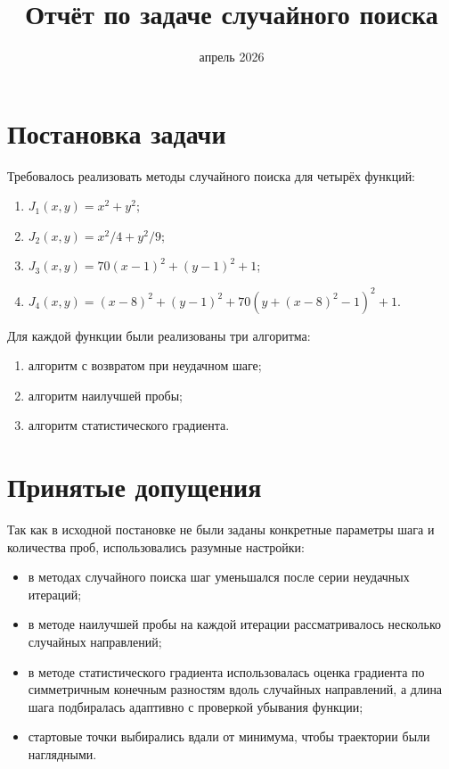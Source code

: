 \documentclass[12pt,a4paper]{article}
\title{Отчёт по задаче случайного поиска}
\author{}
\date{апрель 2026}
\begin{document}
\maketitle

\section*{Постановка задачи}

Требовалось реализовать методы случайного поиска для четырёх функций:
\begin{enumerate}
    \item $J_1(x,y)=x^2+y^2$;
    \item $J_2(x,y)=x^2/4+y^2/9$;
    \item $J_3(x,y)=70(x-1)^2+(y-1)^2+1$;
    \item $J_4(x,y)=(x-8)^2+(y-1)^2+70(y+(x-8)^2-1)^2+1$.
\end{enumerate}

Для каждой функции были реализованы три алгоритма:
\begin{enumerate}
    \item алгоритм с возвратом при неудачном шаге;
    \item алгоритм наилучшей пробы;
    \item алгоритм статистического градиента.
\end{enumerate}

\section*{Принятые допущения}

Так как в исходной постановке не были заданы конкретные параметры шага и количества проб, использовались разумные настройки:
\begin{itemize}
    \item в методах случайного поиска шаг уменьшался после серии неудачных итераций;
    \item в методе наилучшей пробы на каждой итерации рассматривалось несколько случайных направлений;
    \item в методе статистического градиента использовалась оценка градиента по симметричным конечным разностям вдоль случайных направлений, а длина шага подбиралась адаптивно с проверкой убывания функции;
    \item стартовые точки выбирались вдали от минимума, чтобы траектории были наглядными.
\end{itemize}
\end{document}
